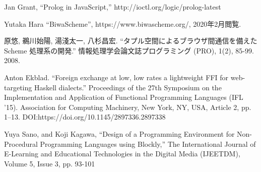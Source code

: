\documentclass{risepaper}
\begin{document}
\begin{thebibliography}{99}
Jan Grant, 
``Prolog in JavaScript,'' 
http://ioctl.org/logic/prolog-latest
 
 Yutaka Hara
 ``BiwaScheme'', https://www.biwascheme.org/, 2020年2月閲覧.
 
原悠, 鵜川始陽, 湯淺太一,  八杉昌宏. 
``タプル空間によるブラウザ間通信を備えた Scheme 処理系の開発.'' 
情報処理学会論文誌プログラミング (PRO), 1(2), 85-99. 2008.

Anton Ekblad. 
``Foreign exchange at low, low rates a lightweight FFI for web-targeting Haskell dialects.''  
Proceedings of the 27th Symposium on the Implementation and Application of Functional Programming Languages (IFL ’15). Association for Computing Machinery, New York, NY, USA, Article 2, pp. 1–13. DOI:https://doi.org/10.1145/2897336.2897338

Yuya Sano, and Koji Kagawa, 
``Design of a Programming Environment for Non-Procedural Programming Languages using Blockly,''  
The International Journal of E-Learning and Educational Technologies in the Digital Media (IJEETDM), Volume 5, Issue 3, pp. 93-101


\end{thebibliography}



\insertindex %
\printindex
  
\end{document}
